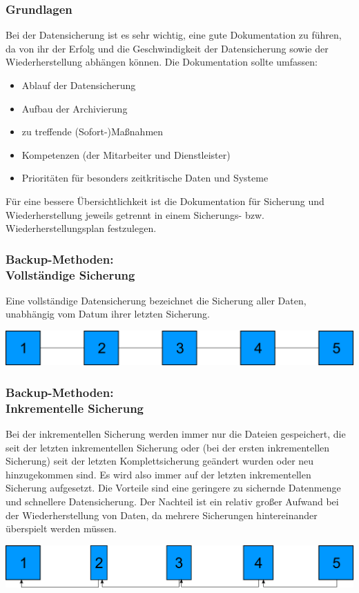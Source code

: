 \begin{frame}
  \frametitle{Grundlagen}
  Bei der Datensicherung ist es sehr wichtig, eine gute Dokumentation zu führen, da von ihr der Erfolg und die Geschwindigkeit der Datensicherung sowie der Wiederherstellung abhängen können.
  Die Dokumentation sollte umfassen:
  \pause
  \begin{itemize}
    \item Ablauf der Datensicherung
    \item Aufbau der Archivierung
    \item zu treffende (Sofort-)Maßnahmen
    \item Kompetenzen (der Mitarbeiter und Dienstleister)
    \item Prioritäten für besonders zeitkritische Daten und Systeme
  \end{itemize}
  \pause
Für eine bessere Übersichtlichkeit ist die Dokumentation für Sicherung und Wiederherstellung jeweils getrennt in einem Sicherungs- bzw. Wiederherstellungsplan festzulegen.
\end{frame}

\begin{frame}
  \frametitle{Backup-Methoden:\\Vollständige Sicherung}
  \pause
  Eine vollständige Datensicherung bezeichnet die Sicherung aller Daten, unabhängig vom Datum ihrer letzten Sicherung.\\
  \pause
  \vspace{10mm}
  \begin{center}
    \includegraphics[width=0.9\linewidth]{Bilder/Vollbackup}
  \end{center}
\end{frame}

\begin{frame}
  \frametitle{Backup-Methoden:\\Inkrementelle Sicherung}
  \pause
  Bei der inkrementellen Sicherung werden immer nur die Dateien gespeichert, die seit der letzten inkrementellen Sicherung oder (bei der ersten inkrementellen Sicherung) seit der letzten Komplettsicherung geändert wurden oder neu hinzugekommen sind. Es wird also immer auf der letzten inkrementellen Sicherung aufgesetzt. Die Vorteile sind eine geringere zu sichernde Datenmenge und schnellere Datensicherung. Der Nachteil ist ein relativ großer Aufwand bei der Wiederherstellung von Daten, da mehrere Sicherungen hintereinander überspielt werden müssen.\\
  \pause
  \vspace{10mm}
  \begin{center}
    \includegraphics[width=0.9\linewidth]{Bilder/InkrementellesBackup}
  \end{center}
\end{frame}

